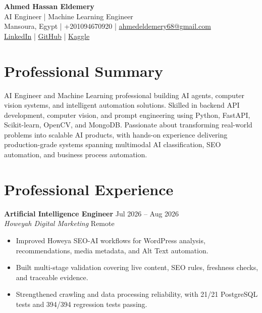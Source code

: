 \documentclass[a4paper,10pt]{article}
\begin{document}
\begin{center}
    {\Huge \textbf{Ahmed Hassan Eldemery}} \\ \vspace{2mm}
    {\Large AI Engineer | Machine Learning Engineer} \\ \vspace{2mm}
    Mansoura, Egypt | +201094670920 | \href{mailto:ahmedeldemery68@gmail.com}{ahmedeldemery68@gmail.com} \\ \vspace{1mm}
    \href{https://www.linkedin.com/in/ahmed-eldemery-a210aa306/}{LinkedIn} |
    \href{https://github.com/Demro7}{GitHub} |
    \href{https://www.kaggle.com/ahmedeldemery}{Kaggle}
\end{center}

\section{Professional Summary}
AI Engineer and Machine Learning professional building AI agents, computer vision systems, and intelligent automation solutions. Skilled in backend API development, computer vision, and prompt engineering using Python, FastAPI, Scikit-learn, OpenCV, and MongoDB. Passionate about transforming real-world problems into scalable AI products, with hands-on experience delivering production-grade systems spanning multimodal AI classification, SEO automation, and business process automation.

\section{Professional Experience}

\textbf{Artificial Intelligence Engineer} \hfill Jul 2026 -- Aug 2026 \\
\textit{Howeyah Digital Marketing} \hfill Remote
\begin{itemize}[noitemsep, topsep=0pt, leftmargin=*]
    \item Improved Howeya SEO-AI workflows for WordPress analysis, recommendations, media metadata, and Alt Text automation.
    \item Built multi-stage validation covering live content, SEO rules, freshness checks, and traceable evidence.
    \item Strengthened crawling and data processing reliability, with 21/21 PostgreSQL tests and 394/394 regression tests passing.
\end{itemize}
\end{document}
